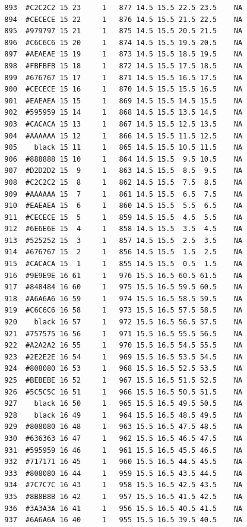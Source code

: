 \documentclass[12pt,twoside]{reedthesis}
\begin{document}
\begin{verbatim}
  893  #C2C2C2 15 23     1   877 14.5 15.5 22.5 23.5    NA
  894  #CECECE 15 22     1   876 14.5 15.5 21.5 22.5    NA
  895  #979797 15 21     1   875 14.5 15.5 20.5 21.5    NA
  896  #C6C6C6 15 20     1   874 14.5 15.5 19.5 20.5    NA
  897  #AEAEAE 15 19     1   873 14.5 15.5 18.5 19.5    NA
  898  #FBFBFB 15 18     1   872 14.5 15.5 17.5 18.5    NA
  899  #676767 15 17     1   871 14.5 15.5 16.5 17.5    NA
  900  #CECECE 15 16     1   870 14.5 15.5 15.5 16.5    NA
  901  #EAEAEA 15 15     1   869 14.5 15.5 14.5 15.5    NA
  902  #595959 15 14     1   868 14.5 15.5 13.5 14.5    NA
  903  #CACACA 15 13     1   867 14.5 15.5 12.5 13.5    NA
  904  #AAAAAA 15 12     1   866 14.5 15.5 11.5 12.5    NA
  905    black 15 11     1   865 14.5 15.5 10.5 11.5    NA
  906  #888888 15 10     1   864 14.5 15.5  9.5 10.5    NA
  907  #D2D2D2 15  9     1   863 14.5 15.5  8.5  9.5    NA
  908  #C2C2C2 15  8     1   862 14.5 15.5  7.5  8.5    NA
  909  #AAAAAA 15  7     1   861 14.5 15.5  6.5  7.5    NA
  910  #EAEAEA 15  6     1   860 14.5 15.5  5.5  6.5    NA
  911  #CECECE 15  5     1   859 14.5 15.5  4.5  5.5    NA
  912  #6E6E6E 15  4     1   858 14.5 15.5  3.5  4.5    NA
  913  #525252 15  3     1   857 14.5 15.5  2.5  3.5    NA
  914  #676767 15  2     1   856 14.5 15.5  1.5  2.5    NA
  915  #CACACA 15  1     1   855 14.5 15.5  0.5  1.5    NA
  916  #9E9E9E 16 61     1   976 15.5 16.5 60.5 61.5    NA
  917  #848484 16 60     1   975 15.5 16.5 59.5 60.5    NA
  918  #A6A6A6 16 59     1   974 15.5 16.5 58.5 59.5    NA
  919  #C6C6C6 16 58     1   973 15.5 16.5 57.5 58.5    NA
  920    black 16 57     1   972 15.5 16.5 56.5 57.5    NA
  921  #757575 16 56     1   971 15.5 16.5 55.5 56.5    NA
  922  #A2A2A2 16 55     1   970 15.5 16.5 54.5 55.5    NA
  923  #2E2E2E 16 54     1   969 15.5 16.5 53.5 54.5    NA
  924  #808080 16 53     1   968 15.5 16.5 52.5 53.5    NA
  925  #BEBEBE 16 52     1   967 15.5 16.5 51.5 52.5    NA
  926  #5C5C5C 16 51     1   966 15.5 16.5 50.5 51.5    NA
  927    black 16 50     1   965 15.5 16.5 49.5 50.5    NA
  928    black 16 49     1   964 15.5 16.5 48.5 49.5    NA
  929  #808080 16 48     1   963 15.5 16.5 47.5 48.5    NA
  930  #636363 16 47     1   962 15.5 16.5 46.5 47.5    NA
  931  #595959 16 46     1   961 15.5 16.5 45.5 46.5    NA
  932  #717171 16 45     1   960 15.5 16.5 44.5 45.5    NA
  933  #808080 16 44     1   959 15.5 16.5 43.5 44.5    NA
  934  #7C7C7C 16 43     1   958 15.5 16.5 42.5 43.5    NA
  935  #8B8B8B 16 42     1   957 15.5 16.5 41.5 42.5    NA
  936  #3A3A3A 16 41     1   956 15.5 16.5 40.5 41.5    NA
  937  #6A6A6A 16 40     1   955 15.5 16.5 39.5 40.5    NA

\end{verbatim}
\end{document}
